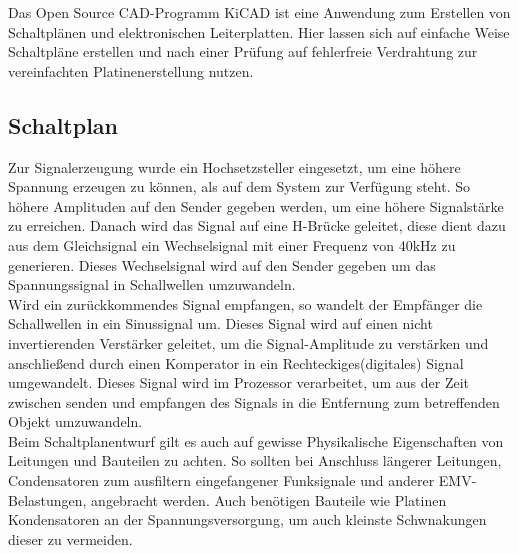 
Das Open Source CAD-Programm KiCAD ist eine Anwendung zum Erstellen von Schaltplänen und elektronischen Leiterplatten. Hier lassen sich auf einfache Weise Schaltpläne erstellen und nach einer Prüfung auf fehlerfreie Verdrahtung zur vereinfachten Platinenerstellung nutzen. 

\subsection{Schaltplan}
Zur Signalerzeugung wurde ein Hochsetzsteller eingesetzt, um eine höhere Spannung erzeugen zu können, als auf dem System zur Verfügung steht. So höhere Amplituden auf den Sender gegeben werden, um eine höhere Signalstärke zu erreichen. Danach wird das Signal auf eine H-Brücke geleitet, diese dient dazu aus dem Gleichsignal ein Wechselsignal mit einer Frequenz von 40kHz zu generieren. Dieses Wechselsignal wird auf den Sender gegeben um das Spannungssignal in Schallwellen umzuwandeln.\\
Wird ein zurückkommendes Signal empfangen, so wandelt der Empfänger die Schallwellen in ein Sinussignal um. Dieses Signal wird auf einen nicht invertierenden Verstärker geleitet, um die Signal-Amplitude zu verstärken und anschließend durch einen Komperator in ein Rechteckiges(digitales) Signal umgewandelt. Dieses Signal wird im Prozessor verarbeitet, um aus der Zeit zwischen senden und empfangen des Signals in die Entfernung zum betreffenden Objekt umzuwandeln.\\
Beim Schaltplanentwurf gilt es auch auf gewisse Physikalische Eigenschaften von Leitungen und Bauteilen zu achten. So sollten bei Anschluss längerer Leitungen, Condensatoren zum ausfiltern eingefangener Funksignale und anderer EMV-Belastungen, angebracht werden. Auch benötigen Bauteile wie Platinen Kondensatoren an der Spannungsversorgung, um auch kleinste Schwnakungen dieser zu vermeiden.

